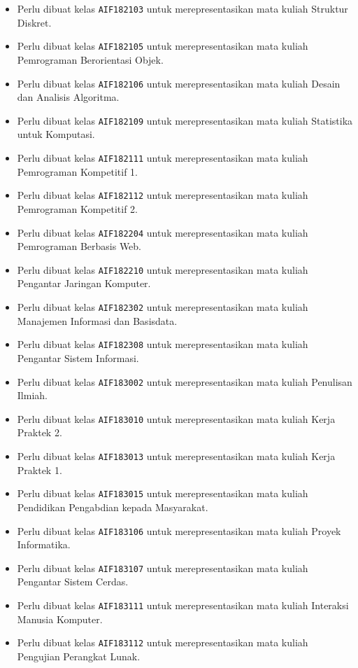 \begin{enumerate}
\begin{itemize}
		\item Perlu dibuat kelas \texttt{AIF182103} untuk merepresentasikan mata kuliah Struktur Diskret.
		\item Perlu dibuat kelas \texttt{AIF182105} untuk merepresentasikan mata kuliah Pemrograman Berorientasi Objek.
		\item Perlu dibuat kelas \texttt{AIF182106} untuk merepresentasikan mata kuliah Desain dan Analisis Algoritma.
		\item Perlu dibuat kelas \texttt{AIF182109} untuk merepresentasikan mata kuliah Statistika untuk Komputasi.
		\item Perlu dibuat kelas \texttt{AIF182111} untuk merepresentasikan mata kuliah Pemrograman Kompetitif 1.
		\item Perlu dibuat kelas \texttt{AIF182112} untuk merepresentasikan mata kuliah Pemrograman Kompetitif 2.
		\item Perlu dibuat kelas \texttt{AIF182204} untuk merepresentasikan mata kuliah Pemrograman Berbasis Web.
		\item Perlu dibuat kelas \texttt{AIF182210} untuk merepresentasikan mata kuliah Pengantar Jaringan Komputer.
		\item Perlu dibuat kelas \texttt{AIF182302} untuk merepresentasikan mata kuliah Manajemen Informasi dan Basisdata.
		\item Perlu dibuat kelas \texttt{AIF182308} untuk merepresentasikan mata kuliah Pengantar Sistem Informasi.
		\item Perlu dibuat kelas \texttt{AIF183002} untuk merepresentasikan mata kuliah Penulisan Ilmiah.
		\item Perlu dibuat kelas \texttt{AIF183010} untuk merepresentasikan mata kuliah Kerja Praktek 2.
		\item Perlu dibuat kelas \texttt{AIF183013} untuk merepresentasikan mata kuliah Kerja Praktek 1.
		\item Perlu dibuat kelas \texttt{AIF183015} untuk merepresentasikan mata kuliah Pendidikan Pengabdian kepada Masyarakat.
		\item Perlu dibuat kelas \texttt{AIF183106} untuk merepresentasikan mata kuliah Proyek Informatika.
		\item Perlu dibuat kelas \texttt{AIF183107} untuk merepresentasikan mata kuliah Pengantar Sistem Cerdas.
		\item Perlu dibuat kelas \texttt{AIF183111} untuk merepresentasikan mata kuliah Interaksi Manusia Komputer.
		\item Perlu dibuat kelas \texttt{AIF183112} untuk merepresentasikan mata kuliah Pengujian Perangkat Lunak.

\end{itemize}
\end{enumerate}
